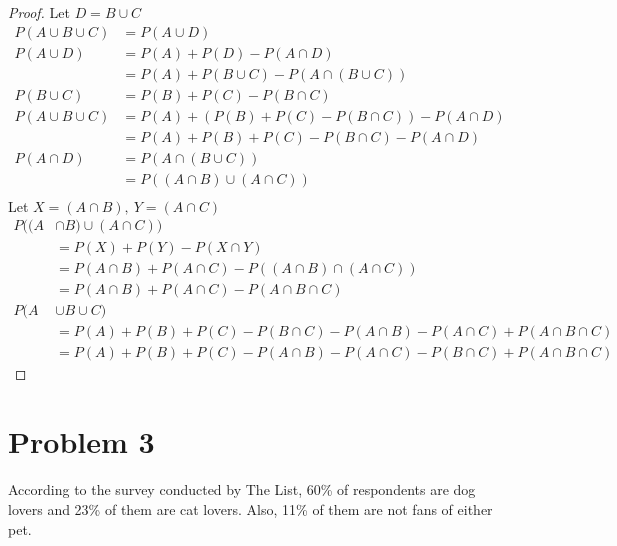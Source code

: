 \documentclass{article}
\begin{document}
\begin{proof}
        Let \(D = B \cup C\)
        \begin{align*}
            P(A \cup B \cup C) &= P(A \cup D) \\
            P(A \cup D) &= P(A) + P(D) - P(A \cap D) \\
            &= P(A) + P(B \cup C) - P(A \cap (B \cup C)) \\
            P(B \cup C) &= P(B) + P(C) - P(B \cap C) \\
            P(A \cup B \cup C) &= P(A) + (P(B) + P(C) - P(B \cap C)) - P(A \cap D) \\
            &= P(A) + P(B) + P(C) - P(B \cap C) - P(A \cap D) \\
            P(A \cap D) &= P(A \cap (B \cup C)) \\
            &= P((A \cap B) \cup (A \cap C)) \\
        \end{align*}
        Let \(X = (A \cap B),\ Y = (A \cap C)\)
        \begin{align*}
            P((A& \cap B) \cup (A \cap C)) \\
            &= P(X) + P(Y) - P(X \cap Y) \\
            &= P(A \cap B) + P(A \cap C) - P((A \cap B) \cap (A \cap C)) \\
            &= P(A \cap B) + P(A \cap C) - P(A \cap B \cap C) \\
            P(A& \cup B \cup C) \\
            &= P(A) + P(B) + P(C) - P(B \cap C) - P(A \cap B) - P(A \cap C) + P(A \cap B \cap C) \\
            &= P(A) + P(B) + P(C) - P(A \cap B) - P(A \cap C) - P(B \cap C) + P(A \cap B \cap C)
        \end{align*}
\end{proof}

\section*{Problem 3}
According to the survey conducted by The List, 60\% of respondents are dog lovers and 23\% of them are cat lovers. Also, 11\% of them are not fans of either pet.
\end{document}
